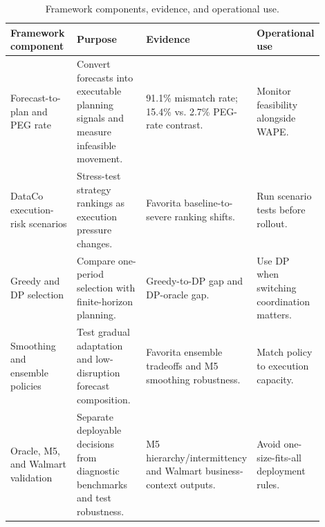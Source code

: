 \begin{table}[htbp]
\centering
\caption{Framework components, evidence, and operational use.}
\label{tab:method-alignment}
\small
\begin{tabular}{@{}p{0.22\linewidth}p{0.24\linewidth}p{0.24\linewidth}p{0.20\linewidth}@{}}
\toprule
\textbf{Framework component} & \textbf{Purpose} & \textbf{Evidence} & \textbf{Operational use} \\
\midrule
Forecast-to-plan and PEG rate & Convert forecasts into executable planning signals and measure infeasible movement. & 91.1\% mismatch rate; 15.4\% vs. 2.7\% PEG-rate contrast. & Monitor feasibility alongside WAPE. \\
DataCo execution-risk scenarios & Stress-test strategy rankings as execution pressure changes. & Favorita baseline-to-severe ranking shifts. & Run scenario tests before rollout. \\
Greedy and DP selection & Compare one-period selection with finite-horizon planning. & Greedy-to-DP gap and DP-oracle gap. & Use DP when switching coordination matters. \\
Smoothing and ensemble policies & Test gradual adaptation and low-disruption forecast composition. & Favorita ensemble tradeoffs and M5 smoothing robustness. & Match policy to execution capacity. \\
Oracle, M5, and Walmart validation & Separate deployable decisions from diagnostic benchmarks and test robustness. & M5 hierarchy/intermittency and Walmart business-context outputs. & Avoid one-size-fits-all deployment rules. \\
\bottomrule
\end{tabular}
\end{table}
